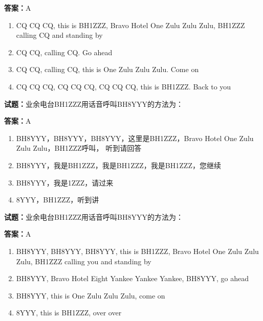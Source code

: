\documentclass{ctexbook}
\begin{document}
\textbf{答案：}A 

\begin{enumerate}[leftmargin=3em]
  \item CQ CQ CQ, this is BH1ZZZ, Bravo Hotel One Zulu Zulu Zulu, BH1ZZZ calling CQ and standing by 

  \item CQ CQ, calling CQ. Go ahead 

  \item CQ CQ, calling CQ, this is One Zulu Zulu Zulu. Come on 

  \item CQ CQ CQ, CQ CQ CQ, CQ CQ CQ, this is BH1ZZZ. Back to you 

\end{enumerate}





\vspace{1em}

\textbf{试题：}业余电台BH1ZZZ用话音呼叫BH8YYY的方法为： 

\textbf{答案：}A 

\begin{enumerate}[leftmargin=3em]
  \item BH8YYY，BH8YYY，BH8YYY，这里是BH1ZZZ，Bravo Hotel One Zulu Zulu Zulu，BH1ZZZ呼叫，
听到请回答 

  \item BH8YYY，我是BH1ZZZ，我是BH1ZZZ，我是BH1ZZZ，您继续 

  \item BH8YYY，我是1ZZZ，请过来 

  \item 8YYY，BH1ZZZ，听到讲 

\end{enumerate}





\vspace{1em}

\textbf{试题：}业余电台BH1ZZZ用话音呼叫BH8YYY的方法为： 

\textbf{答案：}A 

\begin{enumerate}[leftmargin=3em]
  \item BH8YYY, BH8YYY, BH8YYY, this is BH1ZZZ, Bravo Hotel One Zulu Zulu Zulu, BH1ZZZ calling you 
and standing by 

  \item BH8YYY, Bravo Hotel Eight Yankee Yankee Yankee, BH8YYY, go ahead 

  \item BH8YYY, this is One Zulu Zulu Zulu, come on 

  \item 8YYY, this is BH1ZZZ, over over 

\end{enumerate}
\end{document}
